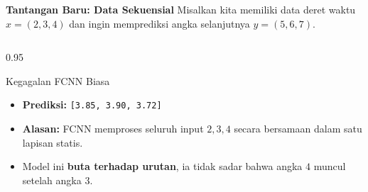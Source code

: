 \documentclass{beamer}
\begin{document}
\begin{frame}{\textbf{Tantangan Baru: Data Sekuensial}}
    Misalkan kita memiliki data deret waktu $x = (2, 3, 4)$ dan ingin memprediksi angka selanjutnya $y = (5, 6, 7)$.
    
    \vspace{0.5cm}
    \begin{center}
    \end{center}
    
    \vspace{0.4cm}
    \begin{columns}
        \begin{column}{0.95\textwidth}
            \begin{alertblock}{Kegagalan FCNN Biasa}
                \begin{itemize}
                    \item \textbf{Prediksi:} \texttt{[3.85, 3.90, 3.72]}
                    \item \textbf{Alasan:} FCNN memproses seluruh input $2, 3, 4$ secara bersamaan dalam satu lapisan statis. 
                    \item Model ini \textbf{buta terhadap urutan}, ia tidak sadar bahwa angka $4$ muncul setelah angka $3$.
                \end{itemize}
            \end{alertblock}
        \end{column}
    \end{columns}
\end{frame}
\end{document}
